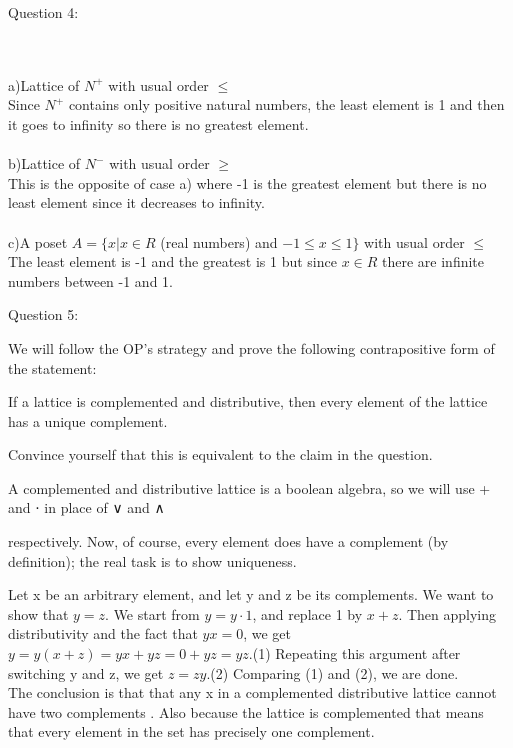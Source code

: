 \documentclass[addpoints,10pt,answers]{exam}
\begin{document}
\begin{questions}
\question Question 4:
\begin{solution}
\\\\ a)Lattice of $ N^+ $ with usual order $ \leq $ \\
Since $ N^+ $ contains only positive natural numbers, the least element is 1 and then it goes to infinity so there is no greatest element.\\
\\b)Lattice of $ N^- $ with usual order $ \geq $\\
This is the opposite of case a) where -1 is the greatest element but there is no least element since it decreases to infinity.\\
\\c)A poset $ A=\{ x|x\in R $ (real numbers) and $ -1\leq x\leq 1\} $ with usual order $ \leq $\\
The least element is -1 and the greatest is 1 but since $ x\in R $ there are infinite numbers between -1 and 1.
\end{solution}


\question Question 5:
\begin{solution}
We will follow the OP's strategy and prove the following contrapositive form of the statement:

If a lattice is complemented and distributive, then every element of the lattice has a unique complement.

Convince yourself that this is equivalent to the claim in the question.

A complemented and distributive lattice is a boolean algebra, so we will use +
and ⋅ in place of ∨ and ∧

respectively. Now, of course, every element does have a complement (by definition); the real task is to show uniqueness.

Let x
be an arbitrary element, and let y and z be its complements. We want to show that $y=z$. We start from
$y=y⋅1$,
and replace 1 by $x+z$. Then applying distributivity and the fact that $yx=0$, we get
$y=y(x+z)=yx+yz=0+yz=yz$.(1)
Repeating this argument after switching y and z, we get
$z=zy$.(2)
Comparing (1) and (2), we are done. 
\\The conclusion is that  that any x in a complemented distributive lattice cannot have two complements . Also because the lattice is complemented that means that every element in the set has precisely one complement.
\end{solution}



\end{questions}
\end{document}
